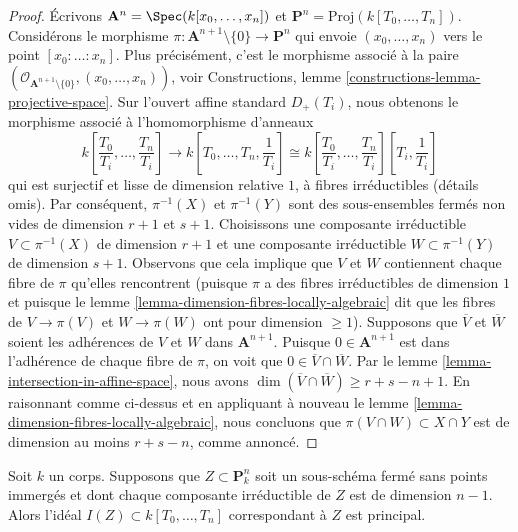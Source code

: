 \begin{proof}
Écrivons $\mathbf{A}^n = \Spec(k[x_0, \ldots, x_n])$ et
$\mathbf{P}^n = \text{Proj}(k[T_0, \ldots, T_n])$.
Considérons le morphisme $\pi : \mathbf{A}^{n + 1}
\setminus \{0\} \to \mathbf{P}^n$ qui envoie $(x_0,
\ldots, x_n)$ vers le point $[x_0 : \ldots : x_n]$. Plus
précisément, c'est le morphisme associé à la paire
$(\mathcal{O}_{\mathbf{A}^{n + 1} \setminus \{0\}}, (x_0,
\ldots, x_n))$, voir Constructions, lemme
\ref{constructions-lemma-projective-space}. Sur l'ouvert affine standard
$D_+(T_i)$, nous obtenons le morphisme associé à l'homomorphisme d'anneaux
$$
k\left[\frac{T_0}{T_i}, \ldots, \frac{T_n}{T_i}\right]
\longrightarrow
k\left[T_0, \ldots, T_n, \frac{1}{T_i}\right] \cong
k\left[\frac{T_0}{T_i}, \ldots, \frac{T_n}{T_i}\right]
\left[T_i, \frac{1}{T_i}\right]
$$
qui est surjectif et lisse de dimension relative $1$, à fibres
irréductibles (détails omis). Par conséquent, $\pi^{-1}(X)$
et $\pi^{-1}(Y)$ sont des sous-ensembles fermés non vides de
dimension $r + 1$ et $s + 1$. Choisissons une composante
irréductible $V \subset \pi^{-1}(X)$ de dimension $r + 1$ et une
composante irréductible $W \subset \pi^{-1}(Y)$ de dimension $s + 1$.
Observons que cela implique que $V$ et $W$ contiennent chaque fibre
de $\pi$ qu'elles rencontrent (puisque $\pi$ a des fibres
irréductibles de dimension $1$ et puisque le lemme
\ref{lemma-dimension-fibres-locally-algebraic} dit que les fibres de $V
\to \pi(V)$ et $W \to \pi(W)$ ont pour dimension $\geq 1$). Supposons
que $\overline{V}$ et $\overline{W}$ soient les adhérences de $V$ et $W$
dans $\mathbf{A}^{n + 1}$. Puisque $0 \in \mathbf{A}^{n + 1}$ est dans
l'adhérence de chaque fibre de $\pi$, on voit que $0 \in
\overline{V} \cap \overline{W}$. Par le lemme
\ref{lemma-intersection-in-affine-space}, nous avons $\dim(\overline{V} \cap
\overline{W}) \geq r + s - n + 1$. En raisonnant comme ci-dessus et en appliquant à
nouveau le lemme \ref{lemma-dimension-fibres-locally-algebraic}, nous concluons que
$\pi(V \cap W) \subset X \cap Y$ est de dimension au moins $r + s - n$, comme annoncé.
\end{proof}

\begin{lemma}
\label{lemma-equation-codim-1-in-projective-space}
Soit $k$ un corps. Supposons que $Z \subset
\mathbf{P}^n_k$ soit un sous-schéma fermé sans points immergés
et dont chaque composante irréductible de $Z$ est de dimension $n - 1$. Alors
l'idéal $I(Z) \subset k[T_0, \ldots, T_n]$ correspondant à $Z$ est principal.
\end{lemma}

